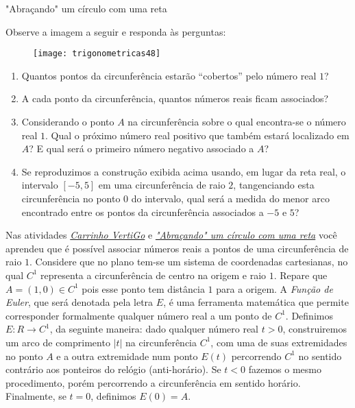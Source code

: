 \begin{task}{"Abraçando"{} um círculo com uma reta}
\label{trig-ativ11}

Observe a imagem a seguir e responda às perguntas:
\begin{figure}[H]
\centering

\texttt{[image: trigonometricas48]}
\end{figure}

\begin{enumerate}
\item Quantos pontos da circunferência estarão “cobertos”{} pelo número real $1$?
\item A cada ponto da circunferência, quantos números reais ficam associados?
\item Considerando o ponto $A$ na circunferência sobre o qual encontra-se o número real $1$. Qual o próximo número real positivo que também estará localizado em $A$? E qual será o primeiro número negativo associado a $A$?
\item Se reproduzimos a construção exibida acima usando, em lugar da reta real, o intervalo $[-5,5]$ em uma circunferência de raio $2$, tangenciando esta circunferência no ponto $0$ do intervalo, qual será a medida do menor arco encontrado entre os pontos da circunferência associados a $-5$ e $5$?
\end{enumerate}
\end{task}

\label{trig-arg3}

Nas atividades \hyperref[trig-ativ10]{\textit{Carrinho VertiGo}} e \hyperref[trig-ativ11]{\textit{"Abraçando"{}  um círculo com uma reta}} você aprendeu que é possível associar números reais a pontos de uma circunferência de raio $1$. Considere que no plano tem-se um sistema de coordenadas cartesianas, no qual $C^1$ representa a circunferência de centro na origem e raio $1$. Repare que $A = (1,0)\in C^1$ pois esse ponto tem distância $1$ para a origem. A \textit{Função de Euler}, que será denotada pela letra $E$, é uma ferramenta matemática que permite corresponder formalmente qualquer número real a um ponto de $C^1$. Definimos $E:R\to C^1$,  da seguinte maneira: dado qualquer número real $t > 0$, construiremos um arco de comprimento $|t|$ na circunferência  $C^1$, com uma de suas extremidades no ponto $A$ e a outra extremidade num ponto $E(t)$ percorrendo $C^1$ no sentido contrário aos ponteiros do relógio (anti-horário). Se $t < 0$ fazemos o mesmo procedimento, porém percorrendo a circunferência em sentido horário. Finalmente, se $t = 0$, definimos $E(0) = A$.

